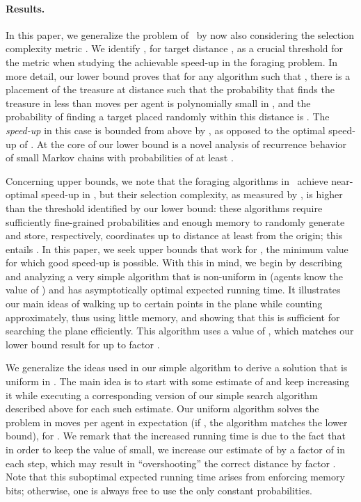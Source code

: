 \documentclass[11pt]{article}
\begin{document}
\paragraph{Results.}
In this paper, we generalize the problem of~\cite{feinerman12podc} by now also considering the selection complexity metric . 
We identify , for target distance , as a crucial threshold for the  metric when studying the achievable speed-up in the foraging problem. In more detail, our lower bound proves that for any algorithm  such that , there is a placement of the treasure at distance  such that the probability that  finds the treasure in less than  moves per agent is polynomially small in , and the probability of finding a target placed randomly within this distance is . The {\em speed-up} in this case is bounded from above by , as opposed to the optimal speed-up of . At the core of our lower bound is a novel analysis of recurrence behavior of small Markov chains with probabilities of at least .

Concerning upper bounds, we note that the foraging algorithms in~\cite{feinerman12podc} achieve near-optimal speed-up in , but their selection complexity, as measured by , is higher than the  threshold identified by our lower bound: these algorithms require sufficiently fine-grained probabilities and enough memory to randomly generate and store, respectively, coordinates up to distance at least  from the origin; this entails . In this paper, we seek upper bounds that work for , the minimum value for which good speed-up is possible. With this in mind, we begin by describing and analyzing a very simple algorithm that is non-uniform in  (agents know the value of ) and has asymptotically optimal expected running time. It illustrates our main ideas of walking up to certain points in the plane while counting approximately, thus using little memory, and showing that this is sufficient for searching the plane efficiently. This algorithm uses a value of , which matches our lower bound result for  up to factor .

We generalize the ideas used in our simple algorithm to derive a solution that is uniform in . The main idea is to start with some estimate of  and keep increasing it while executing a corresponding version of our simple search algorithm described above for each such estimate. Our uniform algorithm solves the problem in   moves per agent in expectation (if , the algorithm matches the  lower bound), for . We remark that the increased running time is due to the fact that in order to keep the value of  small, we increase our estimate of  by a factor of  in each step, which may result in ``overshooting'' the correct distance by factor . Note that this suboptimal expected running time arises from enforcing  memory bits; otherwise, one is always free to use the only constant probabilities.
\end{document}
